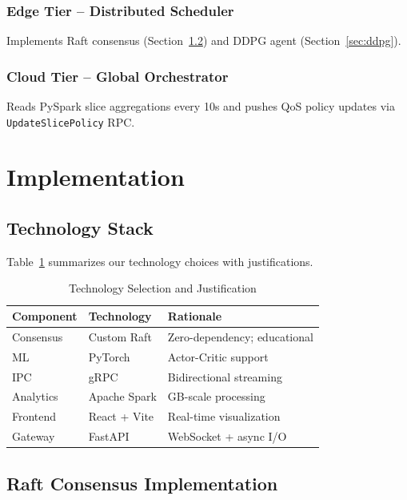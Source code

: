 \documentclass[journal]{IEEEtran}
\begin{document}
\subsubsection{Edge Tier -- Distributed Scheduler}
Implements Raft consensus (Section~\ref{sec:raft}) and DDPG agent (Section~\ref{sec:ddpg}).

\subsubsection{Cloud Tier -- Global Orchestrator}
Reads PySpark slice aggregations every 10s and pushes QoS policy updates via \texttt{UpdateSlicePolicy} RPC.

\section{Implementation}

\subsection{Technology Stack}

Table~\ref{tab:tech_stack} summarizes our technology choices with justifications.

\begin{table}[t]
\centering
\caption{Technology Selection and Justification}
\label{tab:tech_stack}
\begin{tabular}{@{}lll@{}}
\toprule
\textbf{Component} & \textbf{Technology} & \textbf{Rationale} \\
\midrule
Consensus & Custom Raft & Zero-dependency; educational \\
ML & PyTorch & Actor-Critic support \\
IPC & gRPC & Bidirectional streaming \\
Analytics & Apache Spark & GB-scale processing \\
Frontend & React + Vite & Real-time visualization \\
Gateway & FastAPI & WebSocket + async I/O \\
\bottomrule
\end{tabular}
\end{table}

\subsection{Raft Consensus Implementation}
\label{sec:raft}
\end{document}
